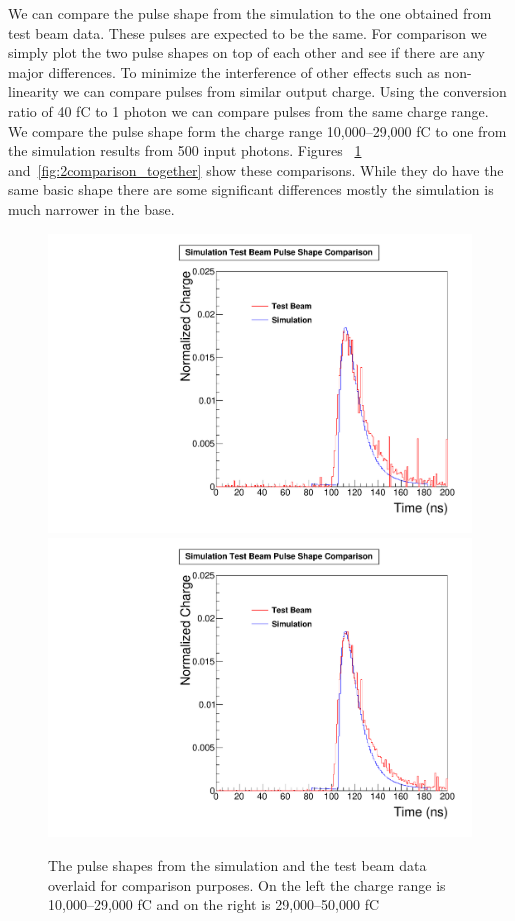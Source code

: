 We can compare the pulse shape from the simulation to the one obtained from test beam data. These pulses are expected to be the same. For comparison we simply plot the two pulse shapes on top of each other and see if there are any major differences. To minimize the interference of other effects such as non-linearity we can compare pulses from similar output charge. Using the conversion ratio of 40 fC to 1 photon we can compare pulses from the same charge range. We compare the pulse shape form the charge range 10,000--29,000 fC to one from the simulation results from 500 input photons. Figures ~\ref{fig:1comparison_together} and~\ref{fig:2comparison_together} show these comparisons. While they do have the same basic shape there are some significant differences mostly the simulation is much narrower in the base.

\begin{figure}
\centering
\includegraphics[width=0.495\linewidth]{Figures/10Comparison.pdf}
\includegraphics[width=0.495\linewidth]{Figures/29Comparison.pdf}
\caption{The pulse shapes from the simulation and the test beam data overlaid for comparison purposes. On the left the charge range is 10,000--29,000 fC and on the right is 29,000--50,000 fC}
\label{fig:1comparison_together}
\end{figure}

